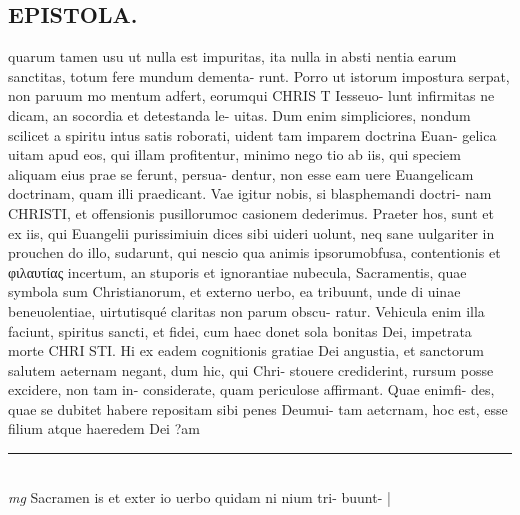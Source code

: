 \documentclass{article}
\begin{document}
\begin{pages}
\section*{EPISTOLA. }\pstart quarum tamen usu ut nulla est impuritas, ita nulla in absti nentia earum sanctitas, totum fere mundum dementa- runt. Porro ut istorum impostura serpat, non paruum mo mentum adfert, eorumqui CHRIS T Iesseuo- lunt infirmitas ne dicam, an socordia et detestanda le- uitas. Dum enim simpliciores, nondum scilicet a spiritu intus satis roborati, uident tam imparem doctrina Euan- gelica uitam apud eos, qui illam profitentur, minimo nego tio ab iis, qui speciem aliquam eius prae se ferunt, persua- dentur, non esse eam uere Euangelicam doctrinam, quam illi praedicant.  Vae igitur nobis, si blasphemandi doctri- nam CHRISTI, et offensionis pusillorumoc casionem dederimus.  \pend\pstart Praeter hos, sunt et ex iis, qui Euangelii purissimiuin dices sibi uideri uolunt, neq sane uulgariter in prouchen do illo, sudarunt, qui nescio qua animis ipsorumobfusa, contentionis et φιλαυτίας incertum, an stuporis et ignorantiae nubecula, Sacramentis, quae symbola sum Christianorum, et externo uerbo, ea tribuunt, unde di uinae beneuolentiae, uirtutisqué claritas non parum obscu- ratur. Vehicula enim illa faciunt, spiritus sancti, et fidei, cum haec donet sola bonitas Dei, impetrata morte CHRI STI. Hi ex eadem cognitionis gratiae Dei angustia, et sanctorum salutem aeternam negant, dum hic, qui Chri- stouere crediderint, rursum posse excidere, non tam in- considerate, quam periculose affirmant. Quae enimfi- des, quae se dubitet habere repositam sibi penes Deumui- tam aetcrnam, hoc est, esse filium atque haeredem Dei ?am  \pend
\vspace{0.5cm}\noindent
\vspace{0.2cm}\rule{1cm}{0.2pt}\\ 
\hspace{0.2cm}\textit{mg}
\footnotesize Sacramen is et exter io uerbo quidam ni nium tri- buunt- 
\normalsize| 

\end{pages}
\end{document}
